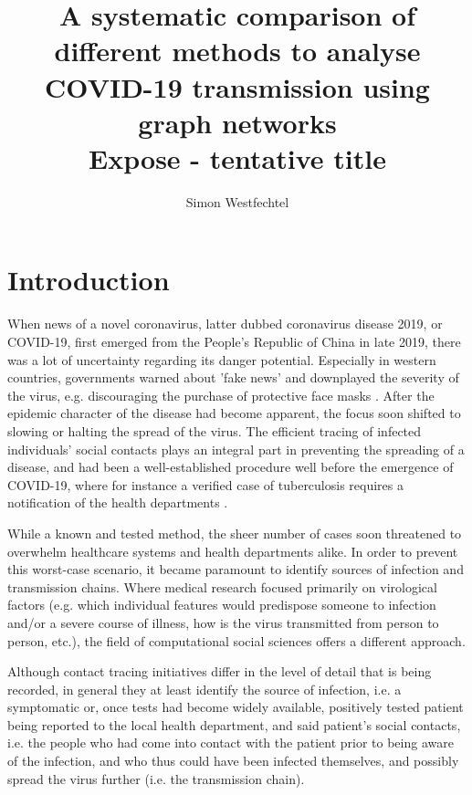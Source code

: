 \documentclass{article}
\title{
	A systematic comparison of different methods to analyse COVID-19 transmission using graph networks\\
	Expose - tentative title	
}
\author{Simon Westfechtel}
\begin{document}
	\maketitle

	\section{Introduction}
	\label{sec:Introduction}
	When news of a novel coronavirus, latter dubbed coronavirus disease 2019, or COVID-19, first emerged from the People's Republic of China in late 2019, there was a lot of uncertainty regarding its danger potential. Especially in western countries, governments warned about 'fake news' and downplayed the severity of the virus, e.g. discouraging the purchase of protective face masks \cite{osthessen_news,tagesschau_1,tagesschau_2}. After the epidemic character of the disease had become apparent, the focus soon shifted to slowing or halting the spread of the virus. The efficient tracing of infected individuals' social contacts plays an integral part in preventing the spreading of a disease, and had been a well-established procedure well before the emergence of COVID-19, where for instance a verified case of tuberculosis requires a notification of the health departments \cite{enwiki_1097839709}. 
	
	While a known and tested method, the sheer number of cases soon threatened to overwhelm healthcare systems and health departments alike. In order to prevent this worst-case scenario, it became paramount to identify sources of infection and transmission chains. Where medical research focused primarily on virological factors (e.g. which individual features would predispose someone to infection and/or a severe course of illness, how is the virus transmitted from person to person, etc.), the field of computational social sciences offers a different approach. 
	
	Although contact tracing initiatives differ in the level of detail that is being recorded, in general they at least identify the source of infection, i.e. a symptomatic or, once tests had become widely available, positively tested patient being reported to the local health department, and said patient's social contacts, i.e. the people who had come into contact with the patient prior to being aware of the infection, and who thus could have been infected themselves, and possibly spread the virus further (i.e. the transmission chain). 
	
\end{document}
